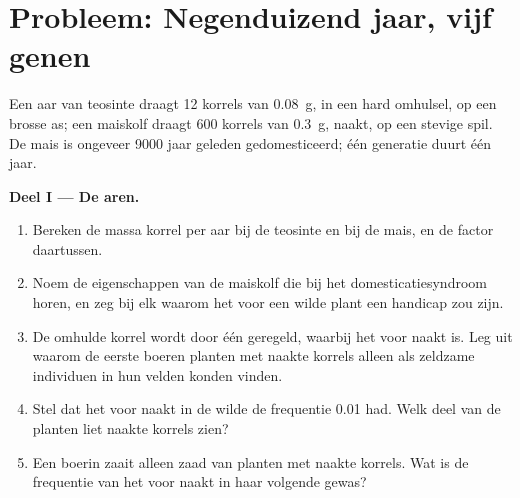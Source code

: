 \section{Probleem: Negenduizend jaar, vijf genen}

\begin{problem}
\label{pb:g12:domesticated-plants:1}
Een aar van teosinte draagt 12 korrels van \qty{0.08}{g}, in een hard
omhulsel, op een brosse as; een maiskolf draagt 600 korrels van
\qty{0.3}{g}, naakt, op een stevige spil. De mais is ongeveer 9000 jaar
geleden gedomesticeerd; één generatie duurt één jaar.

\medskip
\noindent\textbf{Deel I --- De aren.}
\begin{enumerate}
  \item Bereken de massa korrel per aar bij de teosinte en bij de mais,
        en de factor daartussen.
  \item Noem de eigenschappen van de maiskolf die bij het
        domesticatiesyndroom horen, en zeg bij elk waarom het voor een
        wilde plant een handicap zou zijn.
  \item De omhulde korrel wordt door één  geregeld, waarbij het 
        voor naakt  is. Leg uit waarom de eerste boeren planten
        met naakte korrels alleen als zeldzame individuen in hun velden
        konden vinden.
  \item Stel dat het  voor naakt in de wilde  de frequentie
        0.01 had. Welk deel van de planten liet naakte korrels zien?
  \item Een boerin zaait alleen zaad van planten met naakte korrels. Wat
        is de frequentie van het  voor naakt in haar volgende
        gewas?
\end{enumerate}


\end{problem}
